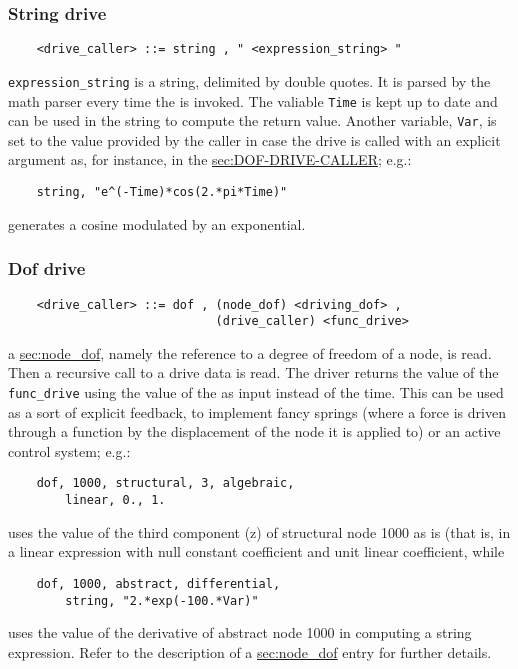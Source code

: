 \subsubsection{String drive}
\begin{verbatim}
    <drive_caller> ::= string , " <expression_string> "
\end{verbatim}
\texttt{expression\_string} is a string, delimited by double quotes.
It is parsed by the math parser every time 
the  is invoked.
The valiable \texttt{Time} is kept up to date and can be used in the 
string to compute the return value.
Another variable, \texttt{Var}, is set to the value provided by the caller
in case the drive is called with an explicit argument as, for instance,
in the \hyperref{dof drive}{dof drive (see Section~}{)}{sec:DOF-DRIVE-CALLER};
e.g.:
\begin{verbatim}
    string, "e^(-Time)*cos(2.*pi*Time)"
\end{verbatim}
generates a cosine modulated by an exponential.


\subsubsection{Dof drive}\label{sec:DOF-DRIVE-CALLER}
\begin{verbatim}
    <drive_caller> ::= dof , (node_dof) <driving_dof> ,
                             (drive_caller) <func_drive>
\end{verbatim}
a \hyperref{\texttt{node\_dof}}{\texttt{node\_dof} (see Section~}{)}{sec:node_dof}, 
namely the reference to a degree of freedom of a node, is read. 
Then a recursive call to a drive data is read. 
The driver returns the value of the \texttt{func\_drive} 
 using the value of the 
 as input instead of the time. 
This can be used as a sort of explicit feedback, to implement fancy
springs (where a force is driven through a function by the displacement
of the node it is applied to) or an active control system; e.g.:
\begin{verbatim}
    dof, 1000, structural, 3, algebraic, 
        linear, 0., 1.
\end{verbatim}
uses the value of the third component (z) of structural node 1000 
as is (that is, in a linear expression with null constant coefficient 
and unit linear coefficient, while
\begin{verbatim}
    dof, 1000, abstract, differential, 
        string, "2.*exp(-100.*Var)"
\end{verbatim}
uses the value of the derivative of abstract node 1000 in computing 
a string expression.
Refer to the description of a 
\hyperref{\texttt{node\_dof}}{\texttt{node\_dof} (see Section~}{)}{sec:node_dof}
entry for further details.

